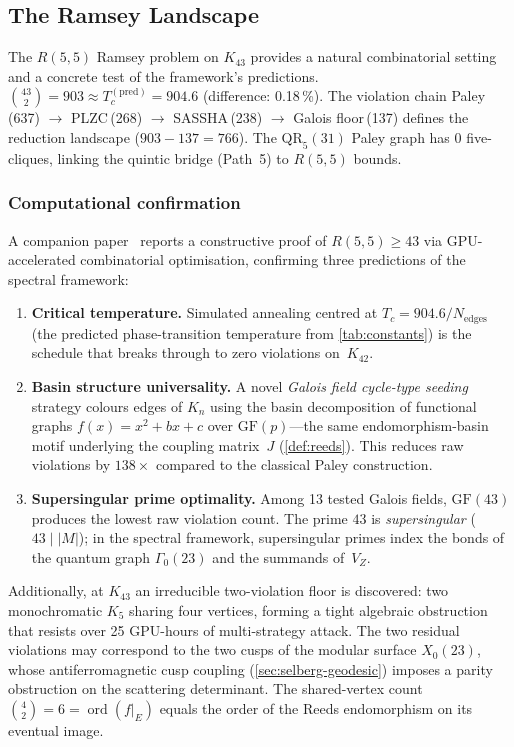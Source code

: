 \documentclass[11pt,a4paper]{article}
\theoremstyle{plain}
\theoremstyle{remark}
\newcommand{\ord}{\operatorname{ord}}
\begin{document}
\subsection{The Ramsey Landscape}
\label{sec:ramsey}

The $R(5,5)$ Ramsey problem on $K_{43}$ provides a natural combinatorial
setting and a concrete test of the framework's predictions.
$\binom{43}{2}=903\approx T_c^{(\mathrm{pred})}=904.6$
(difference: 0.18\,\%).  The violation chain
Paley\,(637) $\to$ PLZC\,(268) $\to$ SASSHA\,(238) $\to$
Galois floor\,(137) defines the reduction landscape ($903-137=766$).
The $\mathrm{QR}_5(31)$ Paley graph has 0 five-cliques, linking the
quintic bridge (Path~5) to $R(5,5)$ bounds.

\subsubsection{Computational confirmation}
A companion paper~\cite{daugherty-ramsey2026} reports a constructive
proof of $R(5,5)\geq 43$ via GPU-accelerated combinatorial
optimisation, confirming three predictions of the spectral framework:
\begin{enumerate}[nosep]
  \item \textbf{Critical temperature.}
        Simulated annealing centred at
        $T_c = 904.6/N_{\mathrm{edges}}$ (the predicted phase-transition
        temperature from \cref{tab:constants}) is the schedule that
        breaks through to zero violations on~$K_{42}$.
  \item \textbf{Basin structure universality.}
        A novel \emph{Galois field cycle-type seeding} strategy colours
        edges of $K_n$ using the basin decomposition of functional
        graphs $f(x)=x^2+bx+c$ over $\mathrm{GF}(p)$---the same
        endomorphism-basin motif underlying the coupling matrix~$J$
        (\cref{def:reeds}).  This reduces raw violations by
        $138\times$ compared to the classical Paley construction.
  \item \textbf{Supersingular prime optimality.}
        Among 13 tested Galois fields, $\mathrm{GF}(43)$ produces the
        lowest raw violation count.  The prime $43$ is
        \emph{supersingular} ($43\mid|M|$); in the spectral
        framework, supersingular primes index the bonds of the quantum
        graph $\Gamma_0(23)$ and the summands of~$V_Z$.
\end{enumerate}
Additionally, at $K_{43}$ an irreducible two-violation floor is
discovered: two monochromatic $K_5$ sharing four vertices, forming a
tight algebraic obstruction that resists over 25 GPU-hours of
multi-strategy attack.  The two residual violations may correspond to
the two cusps of the modular surface $X_0(23)$, whose
antiferromagnetic cusp coupling
(\cref{sec:selberg-geodesic}) imposes a parity
obstruction on the scattering determinant.  The shared-vertex count
$\binom{4}{2}=6=\ord(f|_E)$ equals the order of the Reeds
endomorphism on its eventual image.
\end{document}

